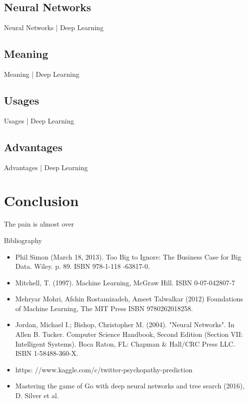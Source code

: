 \documentclass[10pt]{beamer}
\begin{document}
		\subsection{Neural Networks}
			\begin{frame}{Neural Networks | Deep Learning}
			\end{frame}
		\subsection{Meaning}
			\begin{frame}{Meaning | Deep Learning}
			\end{frame}
		\subsection{Usages}
			\begin{frame}{Usages | Deep Learning}
			\end{frame}
		\subsection{Advantages}
			\begin{frame}{Advantages | Deep Learning}
			\end{frame}
	
	
	
	\section{Conclusion}
		\begin{frame}{The pain is almost over}
		\end{frame}
		\begin{frame}{Bibliography}
			\twocolumn
			\begin{itemize}
				\item \scriptsize{Phil Simon (March 18, 2013). Too Big to Ignore: The Business Case for Big Data. Wiley. p. 89. ISBN 978-1-118
					-63817-0.}
				\item \scriptsize{Mitchell, T. (1997). Machine Learning, McGraw Hill. ISBN 0-07-042807-7}
				\item \scriptsize{ Mehryar Mohri, Afshin Rostamizadeh, Ameet Talwalkar (2012) Foundations of Machine Learning, The MIT Press ISBN 9780262018258.}
				\item \scriptsize{Jordan, Michael I.; Bishop, Christopher M. (2004). "Neural Networks". In Allen B. Tucker. Computer Science Handbook, Second Edition (Section VII: Intelligent Systems). Boca Raton, FL: Chapman \& Hall/CRC Press LLC. ISBN 1-58488-360-X.}
				\item \scriptsize{https: //www.kaggle.com/c/twitter-psychopathy-prediction}
				\item \scriptsize{Mastering the game of Go with deep neural networks and tree search (2016), D. Silver et al.}
			\end{itemize}
			\onecolumn
		\end{frame}
\endgroup
\end{document}
